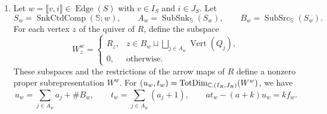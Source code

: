 \begin{lemma}
\begin{enumerate}
\begin{equation}
\begin{aligned}
 &=
 \sum_{\substack{e=\llbracket v,i\rrbracket\in\operatorname{Edge}(S)\\
                  v\in I_S\setminus J,\ i\in I}}f_e\\
 &\quad+\sum_{i\in I}
       \bigl(x(t_i-u_i-1)+(a_i-u_i)\bigr).
\end{aligned}
\end{equation}
\item\label{c:gluing-cut-subrepresentation} Let
$w=\llbracket v,i\rrbracket\in\operatorname{Edge}(S)$ with $v\in I_S$ and $i\in J_S$.
Let
\[
 S_w=\operatorname{SnkCtdComp}(\mathbb S;w),\qquad
 A_w=\operatorname{SubSnk}_{\mathbb S}(S_w),\qquad
 B_w=\operatorname{SubSrc}_{\mathbb S}(S_w).
\]
For each vertex $z$ of the quiver of $R$, define the subspace
\[
 W^w_z=
 \begin{cases}
 R_z,&z\in B_w\sqcup\bigsqcup_{j\in A_w}\operatorname{Vert}(Q_j),\\
 0,&\text{otherwise}.
 \end{cases}
\]
These subspaces and the restrictions of the arrow maps of $R$ define
a nonzero proper subrepresentation $W^w$.
For $(u_w,t_w)=\operatorname{TotDim}_{\mathbb C,(I_R,J_R)}(W^w)$, we have
\[
 u_w=\sum_{j\in A_w}a_j+\#B_w,\qquad
 t_w=\sum_{j\in A_w}(a_j+1),\qquad
 at_w-(a+k)u_w=kf_w.
\]
\end{enumerate}
\end{lemma}
